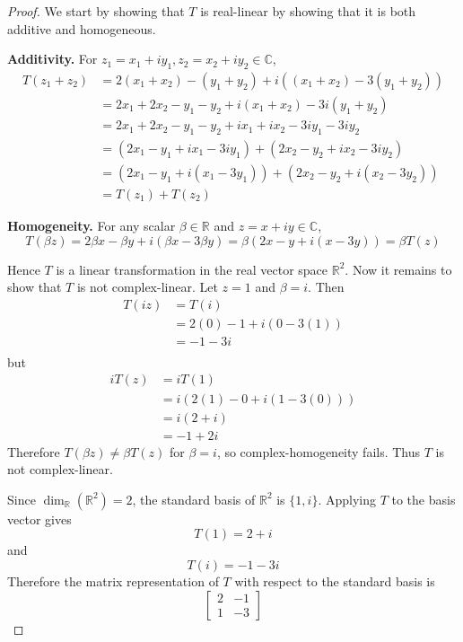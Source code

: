 \documentclass{article}
\begin{document}
\begin{proof}
    We start by showing that $T$ is real-linear by showing that it is both additive and homogeneous.

    \medskip

    \textbf{Additivity.} For $z_1 = x_1 + iy_1, z_2 = x_2 + iy_2 \in \mathbb{C}$, 
    \[
    \begin{aligned}
        T(z_1 + z_2) &= 2(x_1 + x_2) - (y_1 + y_2) + i((x_1 + x_2) - 3(y_1 + y_2)) \\
        &= 2x_1 + 2x_2 - y_1 - y_2 + i(x_1 + x_2) - 3i(y_1 + y_2) \\
        &= 2x_1 + 2x_2 - y_1 - y_2 + ix_1 + ix_2 - 3iy_1 - 3iy_2 \\
        &= (2x_1 - y_1 + ix_1 - 3iy_1) + (2x_2 - y_2 + ix_2 - 3iy_2) \\
        &= (2x_1 - y_1 + i(x_1 - 3y_1)) + (2x_2 - y_2 + i(x_2 - 3y_2)) \\
        &= T(z_1) + T(z_2)
    \end{aligned}
    \]

    \medskip

    \textbf{Homogeneity.} For any scalar $\beta \in \mathbb{R}$ and $z = x + iy \in \mathbb{C}$, 
    \[
    T(\beta z) = 2\beta x - \beta y + i(\beta x - 3\beta y) = \beta(2x - y + i(x - 3y)) = \beta T(z)
    \]

    \medskip

    Hence $T$ is a linear transformation in the real vector space $\mathbb{R}^2$. Now it remains to show 
    that $T$ is not complex-linear. Let $z = 1$ and $\beta = i$. Then 
    \[
    \begin{aligned}
        T(iz) &= T(i) \\
        &= 2(0) - 1 + i(0 - 3(1)) \\
        &= -1 - 3i \\
    \end{aligned}
    \]
    but
    \[
    \begin{aligned}
        iT(z) &= iT(1) \\
        &= i(2(1) - 0 + i(1 - 3(0))) \\
        &= i(2 + i) \\
        &= -1 + 2i
    \end{aligned}
    \]
    Therefore $T(\beta z) \neq \beta T(z)$ for $\beta = i$, so complex-homogeneity fails. Thus $T$ is not 
    complex-linear.

    \medskip

    Since $\dim_\mathbb{R}(\mathbb{R}^2) = 2$, the standard basis of $\mathbb{R}^2$ is $\{1, i\}$. Applying 
    $T$ to the basis vector gives
    \[
    T(1) = 2 + i
    \]
    and 
    \[
    T(i) = -1 - 3i
    \]
    Therefore the matrix representation of $T$ with respect to the standard basis is 
    \[
    \begin{bmatrix}
        2 & -1 \\
        1 & -3
    \end{bmatrix}
    \]


\end{proof}
\end{document}
